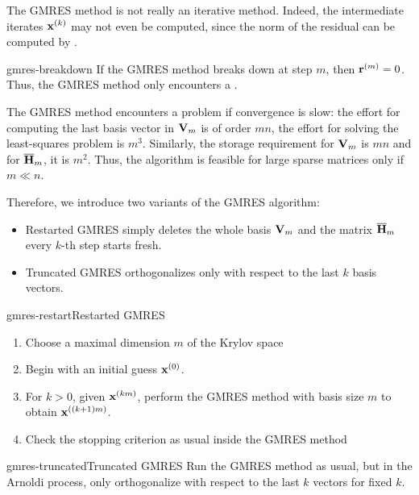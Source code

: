 \begin{remark}
  The GMRES method is not really an iterative method. Indeed, the
  intermediate iterates $\mathbf x^{(k)}$ may not even be computed, since
  the norm of the residual can be computed by
  .
\end{remark}

\begin{Theorem}{gmres-breakdown}
  If the GMRES method breaks down at step $m$, then
  $\mathbf r^{(m)}=0$. Thus, the GMRES method only encounters a
  .
\end{Theorem}

\begin{remark}
  The GMRES method encounters a problem if convergence is slow: the
  effort for computing the last basis vector in $\mathbf V_m$ is of order
  $mn$, the effort for solving the least-squares problem is
  $m^3$. Similarly, the storage requirement for $\mathbf V_m$ is $mn$ and
  for $\overline {\mathbf H}_m$, it is $m^2$. Thus, the algorithm is
  feasible for large sparse matrices only if $m\ll n$.

  Therefore, we introduce two variants of the GMRES algorithm:
  \begin{itemize}
  \item Restarted GMRES simply deletes the whole basis $\mathbf V_m$ and the matrix $\overline{\mathbf H}_m$ every $k$-th step starts fresh.
  \item Truncated GMRES orthogonalizes only with respect to the last
    $k$ basis vectors.
  \end{itemize}
\end{remark}

\begin{Algorithm*}{gmres-restart}{Restarted GMRES}
  \begin{enumerate}
  \item Choose a maximal dimension $m$ of the Krylov space
  \item Begin with an initial guess $\mathbf x^{(0)}$.
  \item For $k>0$, given $\mathbf x^{(km)}$, perform the GMRES method with
    basis size $m$ to obtain $\mathbf x^{((k+1)m)}$.
  \item Check the stopping criterion as usual inside the GMRES method
  \end{enumerate}
\end{Algorithm*}

\begin{Algorithm*}{gmres-truncated}{Truncated GMRES}
  Run the GMRES method as usual, but in the Arnoldi process, only
  orthogonalize with respect to the last $k$ vectors for fixed $k$.
\end{Algorithm*}

